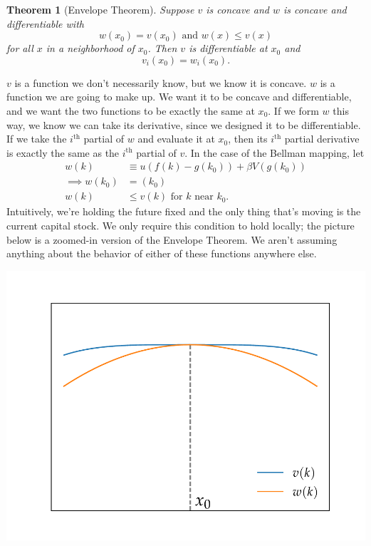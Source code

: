 \documentclass[11pt]{article}
\newtheorem*{theorem}{Theorem}
\begin{document}
\begin{theorem}[Envelope Theorem]
Suppose $v$ is concave and $w$ is concave and differentiable with
\[
w(x_0) = v(x_0) \text{ and } w(x) \le v(x)
\]
for all $x$ in a neighborhood of $x_0$. Then $v$ is differentiable at $x_0$ and
\[
v_i (x_0) = w_i (x_0).
\]
\end{theorem}
\(v\) is a function we don't necessarily know, but we know it is concave. \(w\) is a function we are going to make up. We want it to be concave and differentiable, and we want the two functions to be exactly the same at \(x_0\). If we form \(w\) this way, we know we can take its derivative, since we designed it to be differentiable. If we take the \(i^{\text{th}}\) partial of \(w\) and evaluate it at \(x_0\), then its \(i^{\text{th}}\) partial derivative is exactly the same as the \(i^{\text{th}}\) partial of \(v\). In the case of the Bellman mapping, let
\begin{align*}
w(k) &\equiv u(f(k) - g(k_0)) + \beta V(g(k_0))\\
\implies w(k_0) &= (k_0)\\
w(k) &\le v(k) \text{ for } k \text{ near } k_0.
\end{align*}
Intuitively, we're holding the future fixed and the only thing that's moving is the current capital stock. We only require this condition to hold locally; the picture below is a zoomed-in version of the Envelope Theorem. We aren't assuming anything about the behavior of either of these functions anywhere else.

\begin{center}
\includegraphics[width=.9\linewidth]{./figures/envelope_theorem.pdf}
\end{center}
\end{document}
